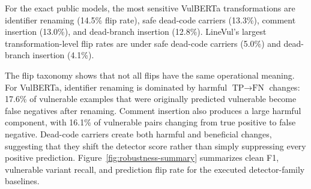 \documentclass[a4paper,fleqn]{cas-dc}
\begin{document}
\begin{table}[t]
  \centering
  \caption{Clean and transformed performance by detector.}
  \label{tab:rq1}
\end{table}

For the exact public models, the most sensitive VulBERTa transformations are
identifier renaming (14.5\% flip rate), safe dead-code carriers (13.3\%),
comment insertion (13.0\%), and dead-branch insertion (12.8\%). LineVul's
largest transformation-level flip rates are under safe dead-code carriers
(5.0\%) and dead-branch insertion (4.1\%).

The flip taxonomy shows that not all flips have the same operational meaning.
For VulBERTa, identifier renaming is dominated by harmful
$\text{TP}\rightarrow\text{FN}$ changes: 17.6\% of vulnerable examples that
were originally predicted vulnerable become false negatives after renaming.
Comment insertion also produces a large harmful component, with 16.1\% of
vulnerable pairs changing from true positive to false negative. Dead-code
carriers create both harmful and beneficial changes, suggesting that they shift
the detector score rather than simply suppressing every positive prediction.
Figure~\ref{fig:robustness-summary} summarizes clean F1, vulnerable variant
recall, and prediction flip rate for the executed detector-family baselines.
\end{document}
